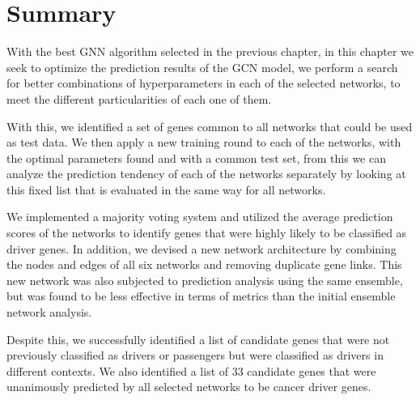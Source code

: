 \section{Summary}

With the best GNN algorithm selected in the previous chapter, in this chapter we seek to optimize the prediction results of the GCN model, we perform a search for better combinations of hyperparameters in each of the selected networks, to meet the different particularities of each one of them.

With this, we identified a set of genes common to all networks that could be used as test data. We then apply a new training round to each of the networks, with the optimal parameters found and with a common test set, from this we can analyze the prediction tendency of each of the networks separately by looking at this fixed list that is evaluated in the same way for all networks.

We implemented a majority voting system and utilized the average prediction scores of the networks to identify genes that were highly likely to be classified as driver genes. In addition, we devised a new network architecture by combining the nodes and edges of all six networks and removing duplicate gene links. This new network was also subjected to prediction analysis using the same ensemble, but was found to be less effective in terms of metrics than the initial ensemble network analysis.

Despite this, we successfully identified a list of candidate genes that were not previously classified as drivers or passengers but were classified as drivers in different contexts. We also identified a list of 33 candidate genes that were unanimously predicted by all selected networks to be cancer driver genes.

